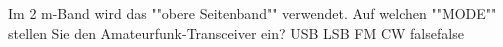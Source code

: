     {Im 2 m-Band wird das ""obere Seitenband"" verwendet. Auf welchen ""MODE"" stellen Sie den Amateurfunk-Transceiver ein?}
    {USB}
    {LSB}
    {FM}
    {CW}
    {false}{false}